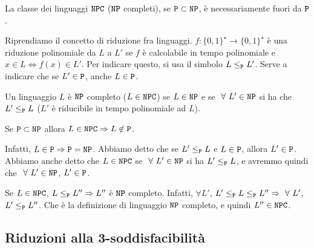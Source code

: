 La classe dei linguaggi $\texttt{NPC}$ ($\texttt{NP}$ completi), se $\texttt{P} \subset \texttt{NP}$, \`e necessariamente fuori da $\texttt{P}$.

Riprendiamo il concetto di riduzione fra linguaggi. $f : \{0,1\}^{\star} \to \{0,1\}^{\star}$ \`e una riduzione polinomiale da $L$ a $L'$ se $f$ \`e calcolabile in tempo polinomiale e $x \in L \iff f(x) \in L'$. Per indicare questo, si usa il simbolo $L \le_{\texttt{P}} L'$. Serve a indicare che se $L' \in \texttt{P}$, anche $L \in \texttt{P}$.

Un linguaggio $L$ \`e $\texttt{NP}$ completo ($L \in \texttt{NPC}$) se $L \in \texttt{NP}$ e se $\forall L' \in \code{NP}$ si ha che $L' \le_{\texttt{P}} L$ ($L'$ \`e riducibile in tempo polinomiale ad $L$).

Se $\texttt{P} \subset \texttt{NP}$ allora $L \in \texttt{NPC} \Rightarrow L \notin \texttt{P}$.

Infatti, $L \in \texttt{P} \Rightarrow \texttt{P} = \texttt{NP}$. Abbiamo detto che se $L' \le_{\texttt{P}} L$ e $L \in \texttt{P}$, allora $L' \in \texttt{P}$. Abbiamo anche detto che $L \in \texttt{NPC}$ se $\forall L' \in \code{NP}$ si ha $L' \le_{\texttt{P}} L$, e avremmo quindi che $\forall L' \in \code{NP}$, $L' \in \texttt{P}$.

Se $L \in \texttt{NPC}$, $L \le_{\texttt{P}} L'' \Rightarrow L''$ \`e $\texttt{NP}$ completo. Infatti, $\forall L'$, $L' \le_{\code{P}} L \le_{\code{P}} L'' \implies \forall L'$, $L' \le_{\texttt{P}} L''$. Che \`e la definizione di linguaggio $\texttt{NP}$ completo, e quindi $L'' \in \texttt{NPC}$.

\subsection{Riduzioni alla 3-soddisfacibilit\`a}

